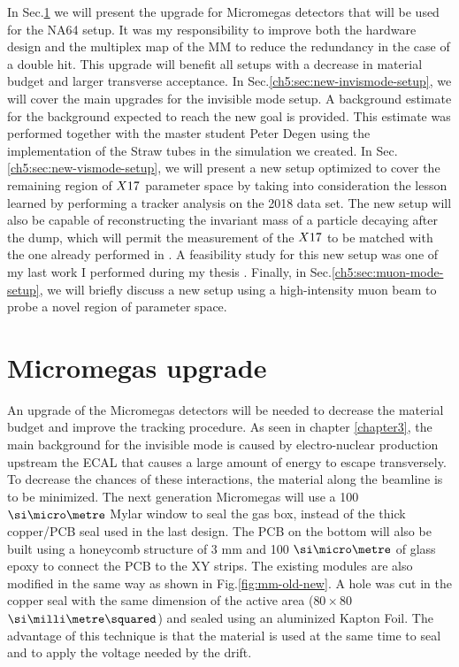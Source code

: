 In Sec.\ref{ch5:sec:mm-upgrades} we will present the upgrade for Micromegas detectors that will be used for the NA64 setup. It was my responsibility to improve both the hardware design and the multiplex map of the MM to reduce the redundancy in the case of a double hit. This upgrade will benefit all setups with a decrease in material budget and larger transverse acceptance. In Sec.\ref{ch5:sec:new-invismode-setup}, we will cover the main upgrades for the invisible mode setup. A background estimate for the background expected to reach the new goal is provided. This estimate was performed together with the master student Peter Degen using the implementation of the Straw tubes in the simulation we created. In Sec.\ref{ch5:sec:new-vismode-setup}, we will present a new setup optimized to cover the remaining region of $X17$ parameter space by taking into consideration the lesson learned by performing a tracker analysis on the 2018 data set. The new setup will also be capable of reconstructing the invariant mass of a particle decaying after the dump, which will permit the measurement of the $X17$ to be matched with the one already performed in \cite{Krasznahorkay:2015iga,Krasznahorkay:2019lyl}. A feasibility study for this new setup was one of my last work I performed during my thesis \cite{Depero:2020zfy}. Finally, in Sec.\ref{ch5:sec:muon-mode-setup}, we will briefly discuss a new setup using a high-intensity muon beam to probe a novel region of parameter space.

\section{Micromegas upgrade}
\label{ch5:sec:mm-upgrades}

An upgrade of the Micromegas detectors will be needed to decrease the material budget and improve the tracking procedure. As seen in chapter \ref{chapter3}, the main background for the invisible mode is caused by electro-nuclear production upstream the ECAL that causes a large amount of energy to escape transversely. To decrease the chances of these interactions, the material along the beamline is to be minimized. The next generation Micromegas will use a 100 $\mum$ Mylar window to seal the gas box, instead of the thick copper/PCB seal used in the last design. The PCB on the bottom will also be built using a honeycomb structure of 3 mm and 100 $\mum$ of glass epoxy to connect the PCB to the XY strips. The existing modules are also modified in the same way as shown in Fig.\ref{fig:mm-old-new}. A hole was cut in the copper seal with the same dimension of the active area ($80 \times 80$ $\mms$) and sealed using an aluminized Kapton Foil. The advantage of this technique is that the material is used at the same time to seal and to apply the voltage needed by the drift.

